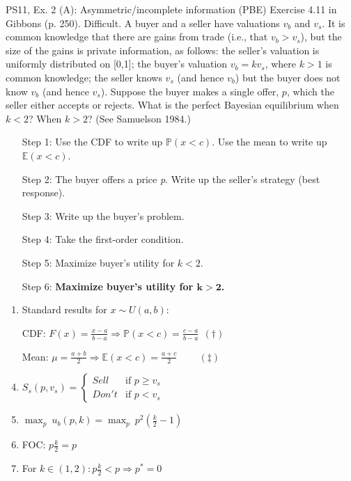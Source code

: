 \begin{frame}{PS11, Ex. 2 (A): Asymmetric/incomplete information (PBE)}
    Exercise 4.11 in Gibbons (p. 250). Difficult. A buyer and a seller have valuations $v_b$ and $v_s$. It is common knowledge that there are gains from trade (i.e., that $v_b > v_s$), but the size of the gains is private information, as follows: the seller’s valuation is uniformly distributed on [0,1]; the buyer’s valuation $v_b = kv_s$, where $k > 1$ is common knowledge; the seller knows $v_s$ (and hence $v_b$) but the buyer does not know $v_b$ (and hence $v_s$). Suppose the buyer makes a single offer, $p$, which the seller either accepts or rejects. What is the perfect Bayesian equilibrium when $k < 2$? When $k > 2$? (See Samuelson 1984.) \vspace{-8pt}
    \begin{multicols}{2}
      \begin{itemize}
        \item[Step 1:] Use the CDF to write up $\mathbb{P}(x<c)$. Use the mean to write up $\mathbb{E}(x<c)$.
        \item[Step 2:] The buyer offers a price \textit{p}. Write up the seller's strategy (best response).
        \item[Step 3:] Write up the buyer's problem.
        \item[Step 4:] Take the first-order condition.
        \item[Step 5:] Maximize buyer's utility for $k<2$.
        \item[Step 6:] \textbf{Maximize buyer's utility for $\bm{k>2}$.}
      \end{itemize}
      \vfill\null\columnbreak
      \begin{enumerate}
        \item Standard results for $x\sim U(a, b):$
        \item[CDF:] $F(x)=\frac{x-a}{b-a}\Rightarrow\mathbb{P}(x<c)=\frac{c-a}{b-a}\ \ (\dagger)$
        \item[Mean:] $\mu=\frac{a+b}{2}\Rightarrow\mathbb{E}(x<c)=\frac{a+c}{2}\quad\quad\ (\ddagger)$
        \item $S_s(p,v_s)=\left\{\begin{array}{ll}
          Sell  & \text{if }p\geq v_s \\
          Don't & \text{if }p < v_s
        \end{array}\right.$
        \item $\displaystyle{\max_p}\ u_b(p,k)=\displaystyle{\max_p}\ p^2\left(\frac{k}{2}-1\right)$
        \item FOC: $p\frac{k}{2}=p$
        \item For $k\in(1,2): p\frac{k}{2}<p\Rightarrow p^*=0$
      \end{enumerate}
      \vfill\null
    \end{multicols}
\end{frame}
